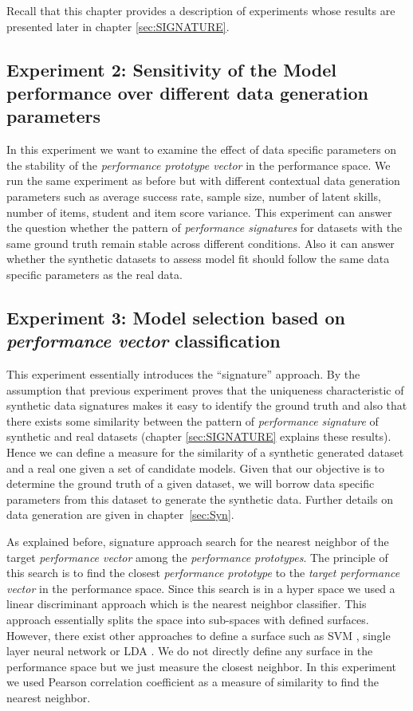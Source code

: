 Recall that this chapter provides a description of experiments whose results are presented later in chapter \ref{sec:SIGNATURE}.

\subsection{Experiment 2: Sensitivity of the Model performance over different data generation parameters}
\label{Sensitive}

In this experiment we want to examine the effect of data specific parameters on the stability of the \textit{performance prototype vector} in the performance space. We run the same experiment as before but with different contextual data generation parameters such as average success rate, sample size, number of latent skills, number of items, student and item score variance. This experiment can answer the question whether the pattern of \textit{performance signatures} for datasets with the same ground truth remain stable across different conditions. Also it can answer whether the synthetic datasets to assess model fit should follow the same data specific parameters as the real data.


\subsection{Experiment 3: Model selection based on \textit{performance vector} classification}
\label{Sigapproach-measure}
This experiment essentially introduces the ``signature'' approach. By the assumption that previous experiment proves that the uniqueness characteristic of synthetic data signatures makes it easy to identify the ground truth and also that there exists some similarity between the pattern of \textit{performance signature} of synthetic and real datasets (chapter \ref{sec:SIGNATURE} explains these results). Hence we can define a measure for the similarity of a synthetic generated dataset and a real one given a set of candidate models. Given that our objective is to determine the ground truth of a given dataset, we will borrow data specific parameters from this dataset to generate the synthetic data. Further details on data generation are given in chapter~\ref{sec:Syn}. 

As explained before, signature approach search for the nearest neighbor of the target \textit{performance vector} among the \textit{performance prototypes}. The principle of this search is to find the closest \textit{performance prototype} to the \textit{target performance vector} in the performance space. Since this search is in a hyper space we used a linear discriminant approach which is the nearest neighbor classifier. This approach essentially splits the space into sub-spaces with defined surfaces. However, there exist other approaches to define a surface such as SVM \citep{cortes1995support,suykens2002least}, single layer neural network \citep{lippmann1987introduction} or LDA \citep{mclachlan2004discriminant,scholkopft1999fisher}. We do not directly define any surface in the performance space but we just measure the closest neighbor. In this experiment we used Pearson correlation coefficient as a measure of similarity to find the nearest neighbor.

